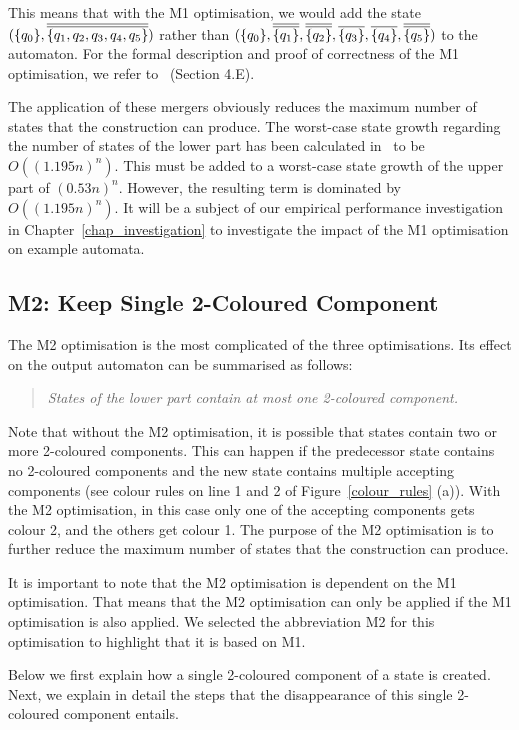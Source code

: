This means that with the M1 optimisation, we would add the state $(\qm0, \cl2{\{q_1, q_2, q_3, q_4, q_5\}})$ rather than $(\qm0, \cl2{\qm1}, \cl2{\qm2}, \cl1{\qm3}, \cl1{\qm4}, \cl2{\qm5})$ to the automaton. For the formal description and proof of correctness of the M1 optimisation, we refer to~\cite{2014_joel_ulrich} (Section 4.E).

The application of these mergers obviously reduces the maximum number of states that the construction can produce. The worst-case state growth regarding the number of states of the lower part has been calculated in~\cite{2014_joel_ulrich} to be $O((1.195n)^n)$. This must be added to a worst-case state growth of the upper part of $(0.53n)^n$. However, the resulting term is dominated by $O((1.195n)^n)$. It will be a subject of our empirical performance investigation in Chapter~\ref{chap_investigation} to investigate the impact of the M1 optimisation on example automata.


\subsection{M2: Keep Single 2-Coloured Component}
The M2 optimisation is the most complicated of the three optimisations. Its effect on the output automaton can be summarised as follows:

\begin{quote}
\centering
\textit{States of the lower part contain at most one 2-coloured component.}
\end{quote}

Note that without the M2 optimisation, it is possible that states contain two or more 2-coloured components. This can happen if the predecessor state contains no 2-coloured components and the new state contains multiple accepting components (see colour rules on line 1 and 2 of Figure~\ref{colour_rules} (a)). With the M2 optimisation, in this case only one of the accepting components gets colour 2, and the others get colour 1. The purpose of the M2 optimisation is to further reduce the maximum number of states that the construction can produce. 

It is important to note that the M2 optimisation is dependent on the M1 optimisation. That means that the M2 optimisation can only be applied if the M1 optimisation is also applied. We selected the abbreviation M2 for this optimisation to highlight that it is based on M1.

Below we first explain how a single 2-coloured component of a state is created. Next, we explain in detail the steps that the disappearance of this single 2-coloured component entails.

